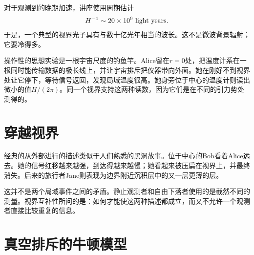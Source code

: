 
对于观测到的晚期加速，讲座使用周期估计
\begin{equation}
H^{-1}\sim 20\times10^9\ {\rm light\ years}.
\label{eq:l09-lecture-horizon-estimate}
\end{equation}
于是，一个典型的视界光子具有与数十亿光年相当的波长。这不是微波背景辐射；它要冷得多。

操作性的思想实验是一根宇宙尺度的钓鱼竿。Alice留在\(r=0\)处，把温度计系在一根同时能传输数据的极长线上，并让宇宙排斥把仪器带向外面。她在刚好不到视界处让它停下，等待信号返回，发现局域温度很高。她身旁位于中心的温度计则读出微小的值\(H/(2\pi)\)。同一个视界支持这两种读数，因为它们是在不同的引力势处测得的。

\section{穿越视界}

经典的从外部进行的描述类似于人们熟悉的黑洞故事。位于中心的Bob看着Alice远去。她的信号红移越来越强，到达得越来越慢；她看起来被压扁在视界上，并最终消失。后来的旅行者Jane则表现为边界附近沉积层中的又一层更薄的层。

\begin{classroomqa}
\end{classroomqa}

\begin{classroomqa}
\end{classroomqa}

这并不是两个局域事件之间的矛盾。静止观测者和自由下落者使用的是截然不同的测量。视界互补性所问的是：如何才能使这两种描述都成立，而又不允许一个观测者直接比较重复的信息。

\section{真空排斥的牛顿模型}

